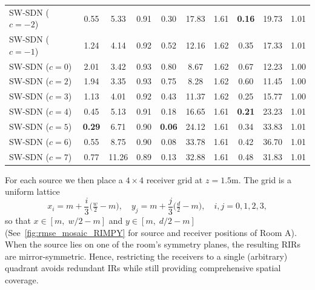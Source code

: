 \documentclass[journal]{IEEEtran}
\begin{document}
\begin{table}[!tb]
\begin{tabular}{lccc|ccc|ccc}
        SW-SDN ($c=-2$)     & 0.55 &  5.33 & 0.91 & 0.30 & 17.83 & 1.61 & \textbf{0.16} & 19.73 & 1.01 \\
        SW-SDN ($c=-1$)     & 1.24 &  4.14 & 0.92 & 0.52 & 12.16 & 1.62 & 0.35 & 17.33 & 1.01 \\
        SW-SDN ($c=0$)      & 2.01 &  3.42 & 0.93 & 0.80 &  8.67 & 1.62 & 0.67 & 12.23 & 1.00 \\
        SW-SDN ($c=2$)      & 1.94 &  3.35 & 0.93 & 0.75 &  8.28 & 1.62 & 0.60 & 11.45 & 1.00 \\
        SW-SDN ($c=3$)      & 1.13 &  4.01 & 0.92 & 0.43 & 11.37 & 1.62 & 0.25 & 15.77 & 1.00 \\
        SW-SDN ($c=4$)      & 0.45 &  5.13 & 0.91 & 0.18 & 16.65 & 1.61 & \textbf{0.21} & 23.23 & 1.01 \\
        SW-SDN ($c=5$)      & \textbf{0.29} &  6.71 & 0.90 & \textbf{0.06} & 24.12 & 1.61 & 0.34 & 33.83 & 1.01 \\
        SW-SDN ($c=6$)      & 0.55 &  8.75 & 0.90 & 0.08 & 33.78 & 1.61 & 0.42 & 36.70 & 1.01 \\
        SW-SDN ($c=7$)      & 0.77 & 11.26 & 0.89 & 0.13 & 32.88 & 1.61 & 0.48 & 31.83 & 1.01 \\
        \bottomrule
    \end{tabular}
\end{table}


For each source we then place a $4\times4$ receiver grid at $z=1.5$m. The grid is a uniform lattice
\[
x_i = m + \frac{i}{3}\bigl(\tfrac{w}{2} - m\bigr), \quad
y_j = m + \frac{j}{3}\bigl(\tfrac{d}{2} - m\bigr),
\quad i,j = 0,1,2,3 ,
\]
so that \(x \in [m,\;w/2-m]\) and \(y \in [m,\;d/2-m]\) (See~\ref{fig:rmse_mosaic_RIMPY} for source and receiver positions of Room A).
When the source lies on one of the room’s symmetry planes, the resulting RIRs are mirror-symmetric. Hence, restricting the receivers to a single (arbitrary) quadrant avoids redundant IRs while still providing comprehensive spatial coverage.
\end{document}
